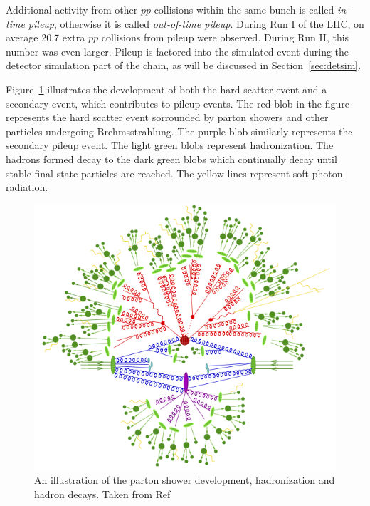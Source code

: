 \par Additional activity from other $pp$ collisions within the same bunch is called {\it in-time pileup}, otherwise 
it is called {\it out-of-time pileup}. During Run I of the LHC, on average 20.7 extra $pp$ collisions 
from pileup were observed. During Run II, this number was even larger. Pileup is factored into the simulated event during 
the detector simulation part of the chain, as will be discussed in Section~\ref{sec:detsim}. 

\par Figure~\ref{fig:pshower} illustrates the development of both the hard scatter event and 
a secondary event, which contributes to pileup events. The red blob in the figure represents the 
hard scatter event sorrounded by parton showers and other particles 
undergoing Brehmsstrahlung. The purple blob similarly represents the secondary pileup event. 
The light green blobs represent hadronization. The hadrons formed decay to the dark green blobs which 
continually decay until stable final state particles are reached. The yellow lines represent 
soft photon radiation.  

\begin{figure}[!h]
   \includegraphics[width=\textwidth]{figures/pShower.png}
\caption{An illustration of the parton shower development, hadronization and hadron decays. 
Taken from Ref~\cite{Hoche:2014rga}}
\label{fig:pshower}
\end{figure}

